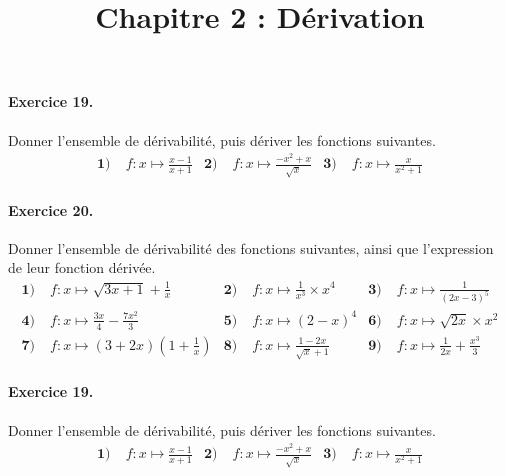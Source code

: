 \documentclass[11pt]{article}
\title{Chapitre 2 : Dérivation}
\date{}
\author{}
\begin{document}

\newcommand{\Cf}{\mathscr{C}_f}

\paragraph{Exercice 19.} Donner l'ensemble de dérivabilité, puis dériver les fonctions suivantes.
\begin{align*}
  \textbf{1)}\; & f:x\mapsto\frac{x-1}{x+1} &
  \textbf{2)}\; & f:x\mapsto\frac{-x^2+x}{\sqrt x} &
  \textbf{3)}\; & f:x\mapsto\frac{x}{x^2+1}
\end{align*}

\paragraph{Exercice 20.} Donner l'ensemble de dérivabilité des fonctions
suivantes, ainsi que l'expression de leur fonction dérivée.
\begin{align*}
  \textbf{1)}\; & f:x\mapsto \sqrt{3x+1}+\frac{1}{x} &
  \textbf{2)}\; & f:x\mapsto \frac{1}{x^3}\times x^4 &
  \textbf{3)}\; & f:x\mapsto \frac{1}{(2x-3)^5} \\
  \textbf{4)}\; & f:x\mapsto \frac{3x}{4}-\frac{7x^2}{3} &
  \textbf{5)}\; & f:x\mapsto (2-x)^4 &
  \textbf{6)}\; & f:x\mapsto \sqrt{2x}\times x^2 \\
  \textbf{7)}\; & f:x\mapsto (3+2x)(1+\frac{1}{x}) &
  \textbf{8)}\; & f:x\mapsto \frac{1-2x}{\sqrt x+1} &
  \textbf{9)}\; & f:x\mapsto \frac{1}{2x}+\frac{x^3}{3}
\end{align*}

\vspace{2cm}

\paragraph{Exercice 19.} Donner l'ensemble de dérivabilité, puis dériver les fonctions suivantes.
\begin{align*}
  \textbf{1)}\; & f:x\mapsto\frac{x-1}{x+1} &
  \textbf{2)}\; & f:x\mapsto\frac{-x^2+x}{\sqrt x} &
  \textbf{3)}\; & f:x\mapsto\frac{x}{x^2+1}
\end{align*}
\end{document}
